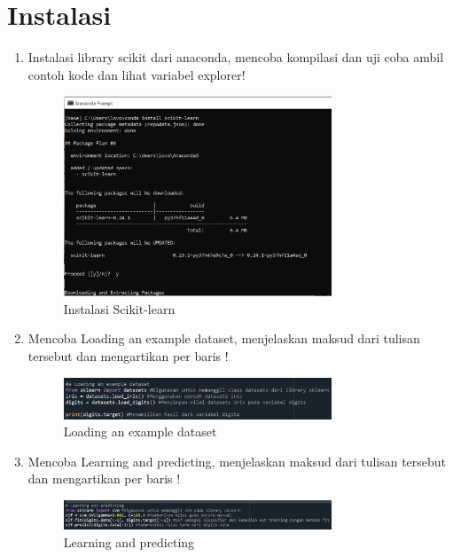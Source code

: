  \section{Instalasi}
\begin{enumerate}
    \item Instalasi library scikit dari anaconda, mencoba kompilasi dan uji coba ambil contoh kode dan lihat variabel explorer! \\
    
    \begin{figure}[!htbp]
        \centering
        \includegraphics [width=8cm]{figures/instal_scikit.PNG}
        \caption{Instalasi Scikit-learn}
        \label{fig:my_label}
        \end{figure}
    
    \item Mencoba Loading an example dataset, menjelaskan maksud dari tulisan tersebut dan mengartikan per baris !
    
     \begin{figure}[!htbp]
        \centering
        \includegraphics [width=8cm]{figures/Loadingdataset.PNG}
        \caption{Loading an example dataset}
        \label{fig:my_label}
        \end{figure}
        
    \item Mencoba Learning and predicting, menjelaskan maksud dari tulisan tersebut dan mengartikan per baris !
    
     \begin{figure}[!htbp]
        \centering
        \includegraphics [width=8cm]{figures/Learningandpredicting.PNG}
        \caption{Learning and predicting}
        \label{fig:my_label}
        \end{figure}
        

\end{enumerate}
